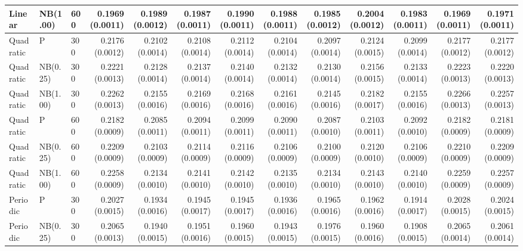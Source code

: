 \begin{table}[p]
{\begin{tabular}{lllrrrrrrrrrr}
Linear & NB(1.00) & 600
& 0.1969 (0.0011)
& 0.1989 (0.0012)
& 0.1987 (0.0011)
& 0.1990 (0.0011)
& 0.1988 (0.0011)
& 0.1985 (0.0012)
& 0.2004 (0.0012)
& 0.1983 (0.0011)
& 0.1969 (0.0011)
& 0.1971 (0.0011) \\

\hline

Quadratic & P & 300
& 0.2176 (0.0012)
& 0.2102 (0.0014)
& 0.2108 (0.0014)
& 0.2112 (0.0014)
& 0.2104 (0.0014)
& 0.2097 (0.0014)
& 0.2124 (0.0015)
& 0.2099 (0.0014)
& 0.2177 (0.0012)
& 0.2177 (0.0012) \\

Quadratic & NB(0.25) & 300
& 0.2221 (0.0013)
& 0.2128 (0.0014)
& 0.2137 (0.0014)
& 0.2140 (0.0014)
& 0.2132 (0.0014)
& 0.2130 (0.0014)
& 0.2156 (0.0015)
& 0.2133 (0.0014)
& 0.2223 (0.0013)
& 0.2220 (0.0013) \\

Quadratic & NB(1.00) & 300
& 0.2262 (0.0013)
& 0.2155 (0.0016)
& 0.2169 (0.0016)
& 0.2168 (0.0016)
& 0.2161 (0.0016)
& 0.2145 (0.0016)
& 0.2182 (0.0017)
& 0.2155 (0.0016)
& 0.2266 (0.0013)
& 0.2257 (0.0013) \\

Quadratic & P & 600
& 0.2182 (0.0009)
& 0.2085 (0.0011)
& 0.2094 (0.0011)
& 0.2099 (0.0011)
& 0.2090 (0.0011)
& 0.2087 (0.0010)
& 0.2103 (0.0011)
& 0.2092 (0.0010)
& 0.2182 (0.0009)
& 0.2181 (0.0009) \\

Quadratic & NB(0.25) & 600
& 0.2209 (0.0009)
& 0.2103 (0.0009)
& 0.2114 (0.0009)
& 0.2116 (0.0009)
& 0.2106 (0.0009)
& 0.2100 (0.0009)
& 0.2120 (0.0010)
& 0.2106 (0.0009)
& 0.2210 (0.0009)
& 0.2209 (0.0009) \\

Quadratic & NB(1.00) & 600
& 0.2258 (0.0009)
& 0.2134 (0.0010)
& 0.2141 (0.0010)
& 0.2142 (0.0010)
& 0.2135 (0.0010)
& 0.2134 (0.0010)
& 0.2143 (0.0010)
& 0.2140 (0.0010)
& 0.2259 (0.0009)
& 0.2257 (0.0009) \\

\hline

Periodic & P & 300
& 0.2027 (0.0015)
& 0.1934 (0.0016)
& 0.1945 (0.0017)
& 0.1945 (0.0017)
& 0.1936 (0.0016)
& 0.1965 (0.0016)
& 0.1962 (0.0016)
& 0.1914 (0.0017)
& 0.2028 (0.0015)
& 0.2024 (0.0015) \\

Periodic & NB(0.25) & 300
& 0.2065 (0.0013)
& 0.1940 (0.0015)
& 0.1951 (0.0016)
& 0.1960 (0.0015)
& 0.1943 (0.0015)
& 0.1976 (0.0015)
& 0.1960 (0.0016)
& 0.1908 (0.0015)
& 0.2065 (0.0014)
& 0.2061 (0.0014) \\


\end{tabular}}
\end{table}
